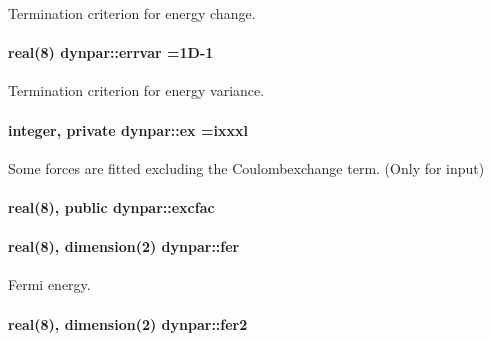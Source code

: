 Termination criterion for energy change. 

\paragraph[{\texorpdfstring{errvar}{errvar}}]{\setlength{\rightskip}{0pt plus 5cm}real(8) dynpar\+::errvar =1\+D-\/1}\hypertarget{namespacedynpar_a75c0e72e8fdd83bcf086d999389b6842}{}\label{namespacedynpar_a75c0e72e8fdd83bcf086d999389b6842}


Termination criterion for energy variance. 

\paragraph[{\texorpdfstring{ex}{ex}}]{\setlength{\rightskip}{0pt plus 5cm}integer, private dynpar\+::ex =ixxxl\hspace{0.3cm}{\ttfamily [private]}}\hypertarget{namespacedynpar_acb60a62a18f7078e85a07b2ecf5a6494}{}\label{namespacedynpar_acb60a62a18f7078e85a07b2ecf5a6494}


Some forces are fitted excluding the Coulombexchange term. (Only for input) 

\paragraph[{\texorpdfstring{excfac}{excfac}}]{\setlength{\rightskip}{0pt plus 5cm}real(8), public dynpar\+::excfac}\hypertarget{namespacedynpar_a103907f87cc49eb26fa37bbe3b7bc949}{}\label{namespacedynpar_a103907f87cc49eb26fa37bbe3b7bc949}
\paragraph[{\texorpdfstring{fer}{fer}}]{\setlength{\rightskip}{0pt plus 5cm}real(8), dimension(2) dynpar\+::fer}\hypertarget{namespacedynpar_ad192a883caa277e6894248778b09dc2d}{}\label{namespacedynpar_ad192a883caa277e6894248778b09dc2d}


Fermi energy. 

\paragraph[{\texorpdfstring{fer2}{fer2}}]{\setlength{\rightskip}{0pt plus 5cm}real(8), dimension(2) dynpar\+::fer2}\hypertarget{namespacedynpar_ac8bb49a0c3ecc099232039bfc9eacf7b}{}\label{namespacedynpar_ac8bb49a0c3ecc099232039bfc9eacf7b}


